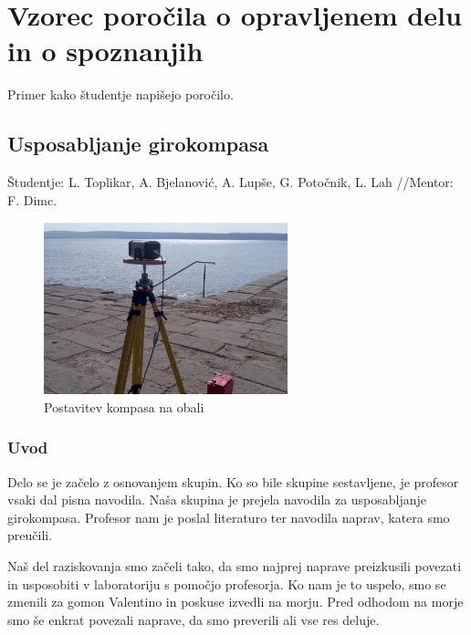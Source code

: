 %
\chapter{Vzorec poročila o opravljenem delu in o spoznanjih}
\label{intro} %

Primer kako študentje napišejo poročilo.

\section{Usposabljanje girokompasa}	
\label{sec:1}
Študentje: L. Toplikar, A. Bjelanović, A. Lupše, G. Potočnik, L. Lah //Mentor: F. Dimc.

\begin{figure}
	\centering
	\includegraphics[height=5cm]{Vaje/VzorecPoroc/figs/Gyro_obala.pdf}
	\caption{Postavitev kompasa na obali}
	\label{fig:Gyro_obala}       %
\end{figure}

\subsection{Uvod}
Delo se je začelo z osnovanjem skupin. Ko so bile skupine sestavljene, je profesor vsaki dal pisna navodila. Naša skupina je prejela navodila za usposabljanje girokompasa. Profesor nam je poslal literaturo ter navodila naprav, katera smo preučili.

Naš del raziskovanja smo začeli tako, da smo najprej naprave preizkusili povezati in usposobiti v laboratoriju s pomočjo profesorja. Ko nam je to uspelo, smo se zmenili za gomon Valentino in poskuse izvedli na morju. Pred odhodom na morje smo še enkrat povezali naprave, da smo preverili ali vse res deluje.


